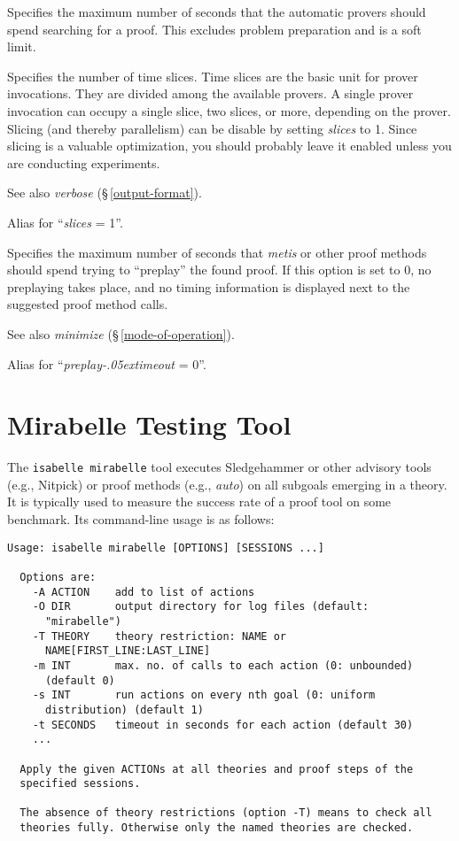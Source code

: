 \documentclass[a4paper,12pt]{article}
\let\oldS=\S
\def\S{\oldS\,}
\renewcommand\_{\hbox{\textunderscore\kern-.05ex}}
\begin{document}
\begin{enum}
Specifies the maximum number of seconds that the automatic provers should spend
searching for a proof. This excludes problem preparation and is a soft limit.

Specifies the number of time slices. Time slices are the basic unit for prover
invocations. They are divided among the available provers. A single prover
invocation can occupy a single slice, two slices, or more, depending on the
prover. Slicing (and thereby parallelism) can be disable by setting
\textit{slices} to 1. Since slicing is a valuable optimization, you should
probably leave it enabled unless you are conducting experiments.

\nopagebreak
{\small See also \textit{verbose} (\S\ref{output-format}).}

\optrueonly{dont\_slice}
Alias for ``\textit{slices} = 1''.

\opdefault{preplay\_timeout}{float}{\upshape 1}
Specifies the maximum number of seconds that \textit{metis} or other proof
methods should spend trying to ``preplay'' the found proof. If this option
is set to 0, no preplaying takes place, and no timing information is displayed
next to the suggested proof method calls.

\nopagebreak
{\small See also \textit{minimize} (\S\ref{mode-of-operation}).}

\optrueonly{dont\_preplay}
Alias for ``\textit{preplay\_timeout} = 0''.

\end{enum}

\section{Mirabelle Testing Tool}
\label{mirabelle}

The \texttt{isabelle mirabelle} tool executes Sledgehammer or other advisory
tools (e.g., Nitpick) or proof methods (e.g., \textit{auto}) on all subgoals
emerging in a theory. It is typically used to measure the success rate of a
proof tool on some benchmark. Its command-line usage is as follows:

{\small
\begin{verbatim}
Usage: isabelle mirabelle [OPTIONS] [SESSIONS ...]

  Options are:
    -A ACTION    add to list of actions
    -O DIR       output directory for log files (default:
      "mirabelle")
    -T THEORY    theory restriction: NAME or
      NAME[FIRST_LINE:LAST_LINE]
    -m INT       max. no. of calls to each action (0: unbounded)
      (default 0)
    -s INT       run actions on every nth goal (0: uniform
      distribution) (default 1)
    -t SECONDS   timeout in seconds for each action (default 30)
    ...

  Apply the given ACTIONs at all theories and proof steps of the
  specified sessions.

  The absence of theory restrictions (option -T) means to check all
  theories fully. Otherwise only the named theories are checked.
\end{verbatim}
}
\end{document}
